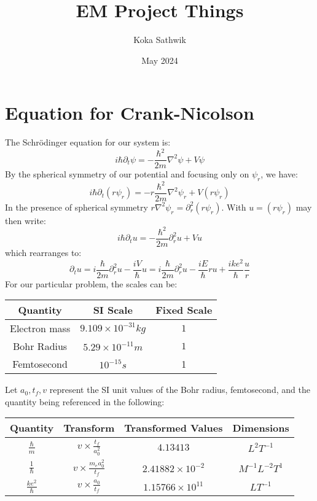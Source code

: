 \documentclass{article}
\title{EM Project Things}
\author{Koka Sathwik }
\date{May 2024}
\begin{document}
\maketitle

\section{Equation for Crank-Nicolson}
The Schrödinger equation for our system is:
\begin{equation}
i\hbar \partial_{t}\psi = - \frac{\hbar^2}{2m} \nabla^{2}\psi + V\psi
\end{equation}
By the spherical symmetry of our potential and focusing only on $\psi_{r}$, we have:
\begin{equation}
i\hbar \partial_{t}\left(r\psi_r\right) = - r\frac{\hbar^2}{2m} \nabla^{2}\psi_r + V\left(r\psi_r\right)
\end{equation}
In the presence of spherical symmetry $r\nabla^2\psi_r = \partial^{2}_{r}\left(r\psi_r\right)$. With $u =\left(r\psi_r\right)$ may then write:
\begin{equation}
i\hbar \partial_{t}u = - \frac{\hbar^2}{2m} \partial_{r}^{2}u + Vu
\end{equation}
which rearranges to:
\begin{equation}
 \partial_{t}u = i\frac{\hbar}{2m} \partial_{r}^{2}u - \frac{iV}{\hbar}u = i\frac{\hbar}{2m} \partial_{r}^{2}u - \frac{iE}{\hbar}ru +\frac{ike^2}{\hbar}\frac{u}{r}
\end{equation}
For our particular problem, the scales can be:
\begin{center}
\begin{tabular}{||c c c||} 
 \hline
 Quantity & SI Scale & Fixed Scale \\ 
 \hline
 Electron mass & $9.109\times10^{-31}kg$& $1$\\
 \hline
 Bohr Radius & $5.29\times 10^{-11}m$ & $1$ \\ 
 \hline
 Femtosecond & $10^{-15}s$ & 1 \\ 
\hline
\end{tabular}
\end{center}
Let $a_0,t_f,v$ represent the SI unit values of the Bohr radius, femtosecond, and the quantity being referenced in the following:
\begin{center}
\begin{tabular}{||c c c c||} 
 \hline
 Quantity & Transform & Transformed Values & Dimensions\\ 
 \hline
 $\frac{\hbar}{m}$ & $v\times\frac{t_f}{a^2_0}$ & $4.13413$ & $L^2T^{-1}$ \\ 
 \hline
 $\frac{1}{\hbar}$ & $v\times\frac{m_e a^2_0}{t_f}$ & $2.41882\times10^{-2}$ & $M^{-1}L^{-2}T^{1}$ \\ 
\hline
$\frac{ke^2}{\hbar}$ & $v\times\frac{a_0}{t_f}$ & $1.15766\times10^{11}$& $LT^{-1}$ \\
\hline
\end{tabular}
\end{center}
\end{document}
